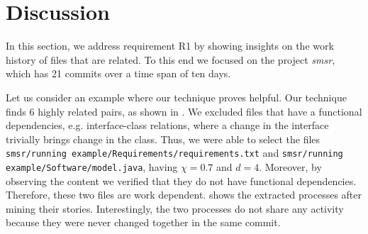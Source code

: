 \section{Discussion}
\label{subsec:qualitative-eval}

In this section, we address requirement R1 by showing insights on the work history of files that are related. To this end we focused on the project \emph{smsr}, which has 21 commits over a time span of ten days.

Let us consider an example where our technique proves helpful. Our technique finds 6 highly related pairs, as shown in . We excluded files that have a functional dependencies, e.g. interface-class relations, where a change in the interface trivially brings change in the class. Thus, we were able to select the files \texttt{smsr/running example/Requirements/requirements.txt} and \texttt{smsr/running example/Software/model.java}, having $\chi=0.7$ and $d=4$. Moreover, by observing the content we verified that they do not have functional dependencies. Therefore, these two files are work dependent.
 shows the extracted processes after mining their stories. Interestingly, the two processes do not share any activity because they were never changed together in the same commit.

